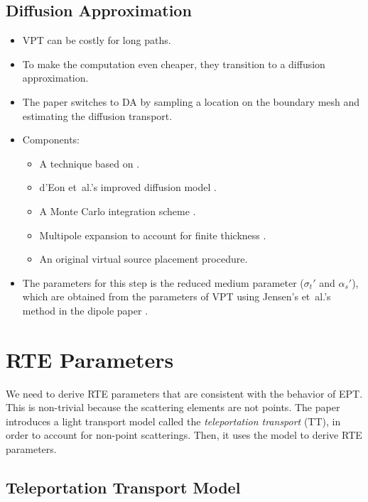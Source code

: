 \documentclass[10pt]{article}
\newcommand{\etal}{{et~al.}}
\begin{document}
  \subsection{Diffusion Approximation}
  \begin{itemize}
  	\item VPT can be costly for long paths.

  	\item To make the computation even cheaper, they transition to a diffusion approximation.

  	\item The paper switches to DA by sampling a location on the boundary mesh and estimating the diffusion transport.

  	\item Components:
  	\begin{itemize}
  		\item A technique based on \cite{Li:2005}.
  		\item d'Eon \etal's improved diffusion model \cite{d'Eon:2011}.
  		\item A Monte Carlo integration scheme \cite{Habel:2013}.
  		\item Multipole expansion to account for finite thickness \cite{Donner:2005}.
  		\item An original virtual source placement procedure.
  	\end{itemize}

  	\item The parameters for this step is the reduced medium parameter ($\sigma_t'$ and $\alpha_s'$), which are obtained from the parameters of VPT using Jensen's \etal's method in the dipole paper \cite{Jensen:2001}. 
  \end{itemize}

  \section{RTE Parameters}

  We need to derive RTE parameters that are consistent with the behavior of EPT.  This is non-trivial because the scattering elements are not points.  The paper introduces a light transport model called the \emph{teleportation transport} (TT), in order to account for non-point scatterings.  Then, it uses the model to derive RTE parameters.

  \subsection{Teleportation Transport Model}
\end{document}
